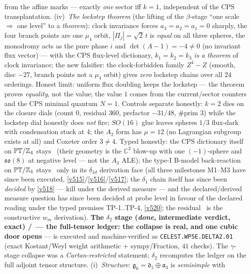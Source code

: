 from the affine marks --- exactly \emph{one} sector iff $k=1$, independent of the CPS
transplantation. (iv)~\emph{The lockstep theorem} (the lifting of the $\beta$-stage ``one scale
$\Rightarrow$ one level'' to a \emph{theorem}): clock invariance forces $a_3=a_2=a_1=0$ sharply,
the four branch points are one $\mu_4$ orbit, $|\Pi_j|=\sqrt2\,t$ is \emph{equal} on all three
spheres, the monodromy acts as the pure phase $i$ and $\det(A-1)=-4\neq0$ (no invariant flux
vector) --- with the CPS flux-level dictionary, $k_1=k_2=k_3$ \emph{is a theorem} of clock
invariance; the new falsifier: the clock-forbidden family $Z^4-Z$ (smooth, disc $-27$, branch
points not a $\mu_4$ orbit) gives \emph{zero} lockstep chains over all $24$ orderings. Honest
limit: uniform flux doubling keeps the lockstep --- the theorem proves \emph{equality}, not the
value; the value $1$ comes from the current/sector counters and the CPS minimal quantum $N=1$.
Controls separate honestly: $k=2$ dies on the closure dials (count $0$, residual $360$,
prefactor $-31/48$, $\#$prim $3$) while the lockstep dial honestly does \emph{not} fire; $SO(16)$
glue leaves spheres $1/3$ flux-dark with condensation stuck at $4$; the $A_2$ form has $\mu=12$
(no Lagrangian subgroup exists at all) and Coxeter order $3\neq4$. Typed honestly: the CPS
dictionary itself on $\mathbb{PT}/\mathbb Z_4$ stays \mC\ (their geometry is the $\mathbb C^2$ blow-up
with one $(-1)$-sphere and $\mathfrak{so}(8)$ at negative level --- not the $A_3$ ALE); the
type-I B-model back-reaction on $\mathbb{PT}/\mathbb Z_4$ stays \mO\ only in its $\delta_{1d}$
derivation face (all three milestones M1--M3 have since been executed,
\vref{v515}/\vref{v516}/\vref{v517}; the $\delta_1$ chain itself has since been
\emph{decided} by \vref{v518} --- kill under the derived measure --- and the declared/derived
measure question has since been decided at probe level in favour of the declared reading under
the typed premises TP-1..TP-4, \vref{v520}; the residual \mO\ is the constructive $w_m$
derivation).
\textbf{The $\delta_2$ stage (\emph{done}, intermediate verdict, exact) \mE/\mC\ --- the
full-tensor ledger: the collapse is real, and one cubic door opens} --- is executed and
machine-verified as \texttt{CELEST.WP5E.DELTA2.01}
 (exact Kostant/Weyl weight arithmetic $+$
sympy/Fraction, $41$ checks). The $\gamma$-stage collapse was a \emph{Cartan-restricted}
statement; $\delta_2$ recomputes the ledger on the full adjoint tensor structure.
(i)~\emph{Structure}: $\mathfrak g_0=\mathfrak d_5\oplus\mathfrak a_3$ is \emph{semisimple} with
